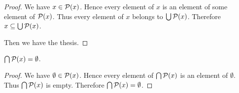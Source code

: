 \documentclass[../../set-theory.ftl.tex]{subfiles}
\begin{document}
\begin{forthel}
\begin{proof}
      We have $x \in \mathcal{P}(x)$.
      Hence every element of $x$ is an element of some element of $\mathcal{P}(x)$.
      Thus every element of $x$ belongs to $\bigcup \mathcal{P}(x)$.
      Therefore $x \subseteq \bigcup \mathcal{P}(x)$.

      Then we have the thesis.
    \end{proof}

    \begin{proposition}\label{SetTheory_01_02_818609}
      $\bigcap \mathcal{P}(x) = \emptyset$.
    \end{proposition}
    \begin{proof}
      We have $\emptyset \in \mathcal{P}(x)$.
      Hence every element of $\bigcap \mathcal{P}(x)$ is an element of $\emptyset$.
      Thus $\bigcap \mathcal{P}(x)$ is empty.
      Therefore $\bigcap \mathcal{P}(x) = \emptyset$.
    \end{proof}
  \end{forthel}
\end{document}
